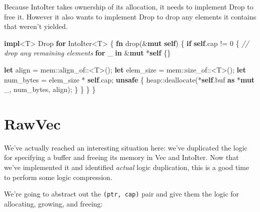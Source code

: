 \documentclass[a4paper,]{book}
\newenvironment{Shaded}{\begin{snugshade}}{\end{snugshade}}
\newcommand{\KeywordTok}[1]{\textcolor[rgb]{0.13,0.29,0.53}{\textbf{{#1}}}}
\newcommand{\DecValTok}[1]{\textcolor[rgb]{0.00,0.00,0.81}{{#1}}}
\newcommand{\CommentTok}[1]{\textcolor[rgb]{0.56,0.35,0.01}{\textit{{#1}}}}
\newcommand{\BuiltInTok}[1]{{#1}}
\newcommand{\NormalTok}[1]{{#1}}
\begin{document}
Because IntoIter takes ownership of its allocation, it needs to
implement Drop to free it. However it also wants to implement Drop to
drop any elements it contains that weren't yielded.

\begin{Shaded}
\begin{Highlighting}[]
\KeywordTok{impl}\NormalTok{<T> }\BuiltInTok{Drop} \KeywordTok{for} \NormalTok{IntoIter<T> \{}
    \KeywordTok{fn} \NormalTok{drop(&}\KeywordTok{mut} \KeywordTok{self}\NormalTok{) \{}
        \KeywordTok{if} \KeywordTok{self}\NormalTok{.cap != }\DecValTok{0} \NormalTok{\{}
            \CommentTok{// drop any remaining elements}
            \KeywordTok{for} \NormalTok{_ }\KeywordTok{in} \NormalTok{&}\KeywordTok{mut} \NormalTok{*}\KeywordTok{self} \NormalTok{\{\}}

            \KeywordTok{let} \NormalTok{align = mem::align_of::<T>();}
            \KeywordTok{let} \NormalTok{elem_size = mem::size_of::<T>();}
            \KeywordTok{let} \NormalTok{num_bytes = elem_size * }\KeywordTok{self}\NormalTok{.cap;}
            \KeywordTok{unsafe} \NormalTok{\{}
                \NormalTok{heap::deallocate(*}\KeywordTok{self}\NormalTok{.buf }\KeywordTok{as} \NormalTok{*}\KeywordTok{mut} \NormalTok{_, num_bytes, align);}
            \NormalTok{\}}
        \NormalTok{\}}
    \NormalTok{\}}
\NormalTok{\}}
\end{Highlighting}
\end{Shaded}

\section{RawVec}\label{sec--vec-raw}

We've actually reached an interesting situation here: we've duplicated
the logic for specifying a buffer and freeing its memory in Vec and
IntoIter. Now that we've implemented it and identified \emph{actual}
logic duplication, this is a good time to perform some logic
compression.

We're going to abstract out the \texttt{(ptr,\ cap)} pair and give them
the logic for allocating, growing, and freeing:
\end{document}
